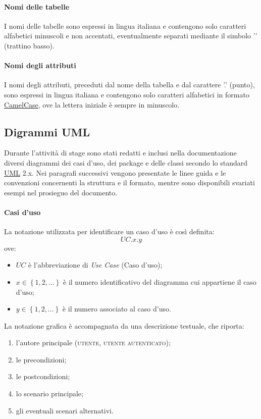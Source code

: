 \paragraph{Nomi delle tabelle}
I nomi delle tabelle sono espressi in lingua italiana e contengono solo caratteri alfabetici minuscoli e non accentati, eventualmente separati mediante il simbolo '\textunderscore' (trattino basso).

\paragraph{Nomi degli attributi}
I nomi degli attributi, preceduti dal nome della tabella e dal carattere '.' (punto), sono espressi in lingua italiana e contengono solo caratteri alfabetici in formato \underline{CamelCase}, ove la lettera iniziale è sempre in minuscolo.

\subsection{Digrammi UML}
Durante l'attività di stage sono stati redatti e inclusi nella documentazione diversi diagrammi dei casi d'uso, dei package e delle classi secondo lo standard \underline{UML} 2.x. Nei paragrafi successivi vengono presentate le linee guida e le convenzioni concernenti la struttura e il formato, mentre sono disponibili svariati esempi nel prosieguo del documento.

\paragraph{Casi d'uso}
La notazione utilizzata per identificare un caso d'uso è così definita:
$$UC.x.y$$
ove:
\begin{itemize}
\item $UC$ è l'abbreviazione di \textit{Use Case} (Caso d'uso);
\item $x \in \left\{1,2,\ldots\right\}$ è il numero identificativo del diagramma cui appartiene il caso d'uso;
\item $y \in \left\{1,2,\ldots\right\}$ è il numero associato al caso d'uso.
\end{itemize}

La notazione grafica è accompagnata da una descrizione testuale, che riporta:
\begin{enumerate}
	\item l'autore principale (\textsc{utente}, \textsc{utente autenticato});
	\item le precondizioni;
	\item le postcondizioni;
	\item lo scenario principale;
	\item gli eventuali scenari alternativi.
\end{enumerate}


